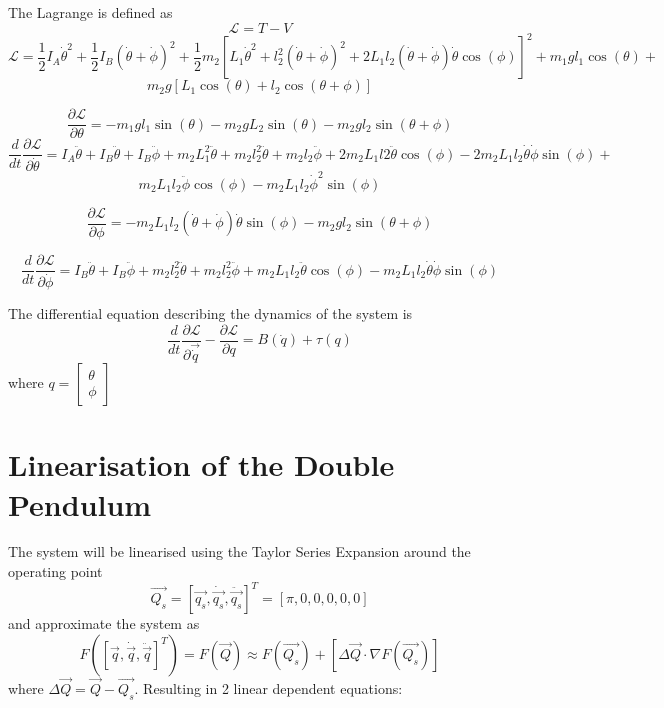 \documentclass[a4paper,12pt]{article}
\begin{document}
\begin{appendices}
		The Lagrange is defined as 
		$$\mathcal{L}=T-V$$
		$$\mathcal{L} = \frac{1}{2}I_{A}\dot{\theta}^2 + \frac{1}{2}I_{B}(\dot{\theta}+\dot{\phi})^2 + \frac{1}{2}m_{2}[L_{1}\dot{\theta}^2+l_{2}^2(\dot{\theta}+\dot{\phi})^2 + 
		2L_{1}l_{2}(\dot{\theta}+\dot{\phi})\dot{\theta}\cos(\phi)]^2+m_{1}gl_{1}\cos(\theta)+$$
		$$m_{2}g[L_{1}\cos(\theta)+l_{2}\cos(\theta+\phi)]$$
		
		$$\frac{\partial\mathcal{L}}{\partial\theta} = -m_{1}gl_{1}\sin(\theta)-m_{2}gL_{2}\sin(\theta)-m_{2}gl_{2}\sin(\theta+\phi)$$
		$$\frac{d}{dt}\frac{\partial\mathcal{L}}{\partial\dot{\theta}} = I_{A}\ddot{\theta}+I_{B}\ddot{\theta}+I_{B}\ddot{\phi}+m_{2}L_{1}^2\ddot{\theta}+m_{2}l_{2}^2\ddot{\theta}+m_{2}l_{2}\ddot{\phi}+2m_{2}L_{1}l{2}\ddot{\theta}\cos(\phi)-2m_{2}L_{1}l_{2}\dot{\theta}\dot{\phi}\sin(\phi)+$$
		$$m_{2}L_{1}l_{2}\ddot{\phi}\cos(\phi)-m_{2}L_{1}l_{2}\dot{\phi}^2\sin(\phi)$$
		
		
		$$\frac{\partial\mathcal{L}}{\partial\phi} = -m_{2}L_{1}l_{2}(\dot{\theta}+\dot{\phi})\dot{\theta}\sin(\phi)-m_{2}gl_{2}\sin(\theta+\phi)$$
		
		$$\frac{d}{dt}\frac{\partial\mathcal{L}}{\partial\dot{\phi}}=I_{B}\ddot{\theta}+I_{B}\ddot{\phi}+m_{2}l_{2}^2\ddot{\theta}+m_{2}l_{2}^2\ddot{\phi}+m_{2}L_{1}l_{2}\ddot{\theta}\cos(\phi)-m_{2}L_{1}l_{2}\dot{\theta}\dot{\phi}\sin(\phi)$$
		
		The differential equation describing the dynamics of the system is
		$$\frac{d}{dt}\frac{\partial\mathcal{L}}{\partial\vec{\dot{q}}}-\frac{\partial\mathcal{L}}{\partial q} = B(\dot{q})+\tau(q)$$ 
		where  $ q = 
		\begin{bmatrix}
		\theta \\
		\phi
		\end{bmatrix}
		$
		
		\newpage
		\section{Linearisation of the Double Pendulum}
			
		The system will be linearised using the Taylor Series Expansion around the operating point $$ \vec{Q_{s}} = [\vec{q_{s}},\dot{\vec{q_{s}}},\ddot{\vec{q_{s}}}]^{T}=[\pi,0,0,0,0,0]$$ and approximate the system as $$F([\vec{q},\dot{\vec{q}},\ddot{\vec{q}} ]^{T}) = F(\vec{Q}) \approx F(\vec{Q_{s}})+[\Delta{\vec{Q}}\cdot\nabla F(\vec{Q_{s}})] $$
		where $\Delta{\vec{Q}} = \vec{Q} - \vec{Q_{s}} $. Resulting in 2 linear dependent equations:
		

\end{appendices}
\end{document}
